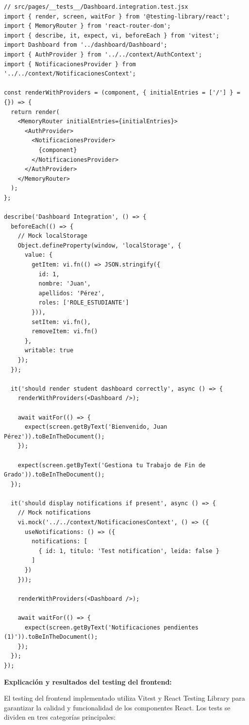 \documentclass[12pt,a4paper,oneside]{report}
\begin{document}
\begin{lstlisting}
// src/pages/__tests__/Dashboard.integration.test.jsx
import { render, screen, waitFor } from '@testing-library/react';
import { MemoryRouter } from 'react-router-dom';
import { describe, it, expect, vi, beforeEach } from 'vitest';
import Dashboard from '../dashboard/Dashboard';
import { AuthProvider } from '../../context/AuthContext';
import { NotificacionesProvider } from '../../context/NotificacionesContext';

const renderWithProviders = (component, { initialEntries = ['/'] } = {}) => {
  return render(
    <MemoryRouter initialEntries={initialEntries}>
      <AuthProvider>
        <NotificacionesProvider>
          {component}
        </NotificacionesProvider>
      </AuthProvider>
    </MemoryRouter>
  );
};

describe('Dashboard Integration', () => {
  beforeEach(() => {
    // Mock localStorage
    Object.defineProperty(window, 'localStorage', {
      value: {
        getItem: vi.fn(() => JSON.stringify({
          id: 1,
          nombre: 'Juan',
          apellidos: 'Pérez',
          roles: ['ROLE_ESTUDIANTE']
        })),
        setItem: vi.fn(),
        removeItem: vi.fn()
      },
      writable: true
    });
  });

  it('should render student dashboard correctly', async () => {
    renderWithProviders(<Dashboard />);

    await waitFor(() => {
      expect(screen.getByText('Bienvenido, Juan Pérez')).toBeInTheDocument();
    });

    expect(screen.getByText('Gestiona tu Trabajo de Fin de Grado')).toBeInTheDocument();
  });

  it('should display notifications if present', async () => {
    // Mock notifications
    vi.mock('../../context/NotificacionesContext', () => ({
      useNotifications: () => ({
        notifications: [
          { id: 1, titulo: 'Test notification', leida: false }
        ]
      })
    }));

    renderWithProviders(<Dashboard />);

    await waitFor(() => {
      expect(screen.getByText('Notificaciones pendientes (1)')).toBeInTheDocument();
    });
  });
});
\end{lstlisting}

\textbf{Explicación y resultados del testing del frontend:}

El testing del frontend implementado utiliza Vitest y React Testing Library para garantizar la calidad y funcionalidad de los componentes React. Los tests se dividen en tres categorías principales:
\end{document}

